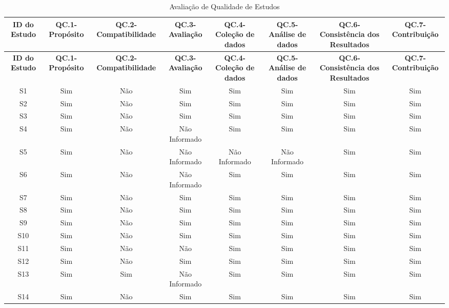 \begin{landscape}
	\tiny
	\begin{longtable}{c|c|c|c|c|c|c|c}
		\caption{Avaliação de Qualidade de Estudos}
		\label{table:ranking} \\\hline
		\textbf{ID do Estudo} &
		\textbf{QC.1-Propósito} &
		\textbf{QC.2-Compatibilidade} &
		\textbf{QC.3-Avaliação} &
		\textbf{QC.4-Coleção de dados} &
		\textbf{QC.5-Análise de dados} &
		\textbf{QC.6-Consistência dos Resultados} &
		\textbf{QC.7-Contribuição} 
		\\\hline \hline
		\endfirsthead
		
		
		\textbf{ID do Estudo} &
		\textbf{QC.1-Propósito} &
		\textbf{QC.2-Compatibilidade} &
		\textbf{QC.3-Avaliação} &
		\textbf{QC.4-Coleção de dados} &
		\textbf{QC.5-Análise de dados} &
		\textbf{QC.6-Consistência dos Resultados} &
		\textbf{QC.7-Contribuição} 
		\\\hline \hline
		\endhead
		S1 & Sim & Não & Sim & Sim & Sim & Sim & Sim \\\hline
		S2 & Sim & Não & Sim & Sim & Sim & Sim & Sim \\\hline
		S3 & Sim & Não & Sim & Sim & Sim & Sim & Sim \\\hline
		S4 & Sim & Não & Não Informado & Sim & Sim & Sim & Sim \\\hline
		S5 & Sim & Não & Não Informado & Não Informado & Não Informado & Sim & Sim \\\hline
		S6 & Sim & Não & Não Informado & Sim & Sim & Sim & Sim \\\hline
		S7 & Sim & Não & Sim & Sim & Sim & Sim & Sim \\\hline
		S8 & Sim & Não & Sim & Sim & Sim & Sim & Sim \\\hline
		S9 & Sim & Não & Sim & Sim & Sim & Sim & Sim \\\hline
		S10 & Sim & Não & Sim & Sim & Sim & Sim & Sim \\\hline
		S11 & Sim & Não & Não & Sim & Sim & Sim & Sim \\\hline
		S12 & Sim & Não & Sim & Sim & Sim & Sim & Sim \\\hline
		S13 & Sim & Sim & Não Informado & Sim & Sim & Sim & Sim \\\hline
		S14 & Sim & Não & Sim & Sim & Sim & Sim & Sim \\\hline

\end{longtable}
\end{landscape}
